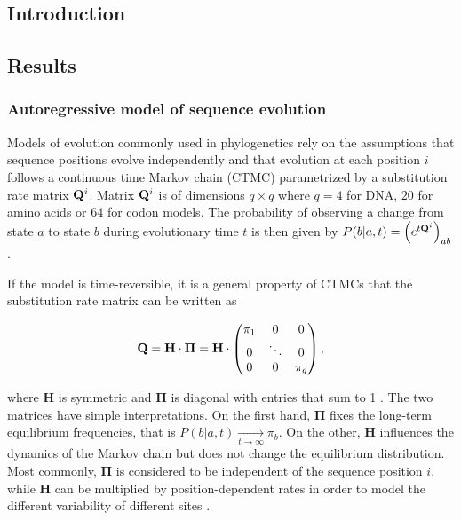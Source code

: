 
\subsection{Introduction}

\subsection{Results} %
\label{sub:results}

\subsubsection{Autoregressive model of sequence evolution} 
\label{sub:autoregressive_sequence_evolution_model}

Models of evolution commonly used in phylogenetics rely on the assumptions that sequence positions evolve independently and that evolution at each position $i$ follows a continuous time Markov chain (CTMC) parametrized by a substitution rate matrix $\mathbf{Q}^i$. 
Matrix $\mathbf{Q}^i$ is of dimensions $q \times q$ where $q=4$ for DNA, $20$ for amino acids or $64$ for codon models.
The probability of observing a change from state $a$ to state $b$ during evolutionary time $t$ is then given by $P(b \vert a, t) = \left( e^{t\mathbf{Q}^i} \right)_{ab}$.

If the model is time-reversible, it is a general property of CTMCs that the substitution rate matrix can be written as 

\begin{equation}
	\label{eq:Q_decomposition}
	\mathbf{Q} = \mathbf{H}\cdot \mathbf{\Pi} = \mathbf{H} \cdot \begin{pmatrix}
		\pi_1 & 0 & 0\\ 
		0 & \ddots & 0 \\
		0 & 0 & \pi_q
	\end{pmatrix},
\end{equation}

where $\mathbf{H}$ is symmetric and $\mathbf{\Pi}$ is diagonal with entries that sum to 1 \cite{yang_computationalmolecularevolution_2006}. 
The two matrices have simple interpretations. 
On the first hand, $\mathbf{\Pi}$ fixes the long-term equilibrium frequencies, that is $P(b \vert a, t) \xrightarrow[t \rightarrow \infty]{} \pi_b$.
On the other, $\mathbf{H}$ influences the dynamics of the Markov chain but does not change the equilibrium distribution. 
Most commonly, $\mathbf{\Pi}$ is considered to be independent of the sequence position $i$, while $\mathbf{H}$ can be multiplied by position-dependent rates in order to model the different variability of different sites \cite{yang_maximumlikelihoodphylogenetic_1994,stamatakis_raxmlversiontool_2014,nguyen_iqtreefasteffective_2015}. \\


